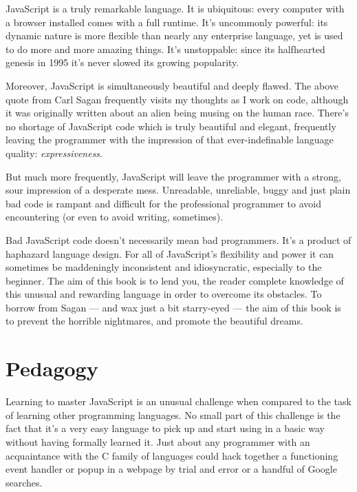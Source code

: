 \documentclass[11pt,letter]{book}
\begin{document}
    JavaScript is a truly remarkable language. It is ubiquitous: every computer with a browser 
    installed comes with a full runtime. It's uncommonly powerful: its dynamic nature is more 
    flexible than nearly any enterprise language, yet is used to do more and more amazing things.
    It's unstoppable: since its halfhearted genesis in 1995 it's never slowed its growing 
    popularity.
    
    Moreover, JavaScript is simultaneously beautiful and deeply flawed. The above quote from Carl 
    Sagan frequently visits my thoughts as I work on code, although it was originally written about 
    an alien being musing on the human race. There's no shortage of JavaScript code which is truly 
    beautiful and elegant, frequently leaving the programmer with the impression of that 
    ever-indefinable language quality: \emph{expressiveness}.
    
    But much more frequently, JavaScript will leave the programmer with a strong, sour impression of 
    a desperate mess. Unreadable, unreliable, buggy and just plain bad code is rampant and difficult 
    for the professional programmer to avoid encountering (or even to avoid writing, sometimes).
    
    Bad JavaScript code doesn't necessarily mean bad programmers. It's a product of haphazard 
    language design. For all of JavaScript's flexibility and power it can sometimes be maddeningly 
    inconsistent and idiosyncratic, especially to the beginner. The aim of this book is to lend you, 
    the reader complete knowledge of this unusual and rewarding language in order to overcome its 
    obstacles. To borrow from Sagan --- and wax just a bit starry-eyed --- the aim of this 
    book is to prevent the horrible nightmares, and promote the beautiful dreams.
    
    \section*{Pedagogy}
    Learning to master JavaScript is an unusual challenge when compared to the task of learning 
    other programming languages. No small part of this challenge is the fact that it's a very easy 
    language to pick up and start using in a basic way without having formally learned it. Just 
    about any programmer with an acquaintance with the C family of languages could hack together a 
    functioning event handler or popup in a webpage by trial and error or a handful of Google 
    searches.
    
\end{document}
